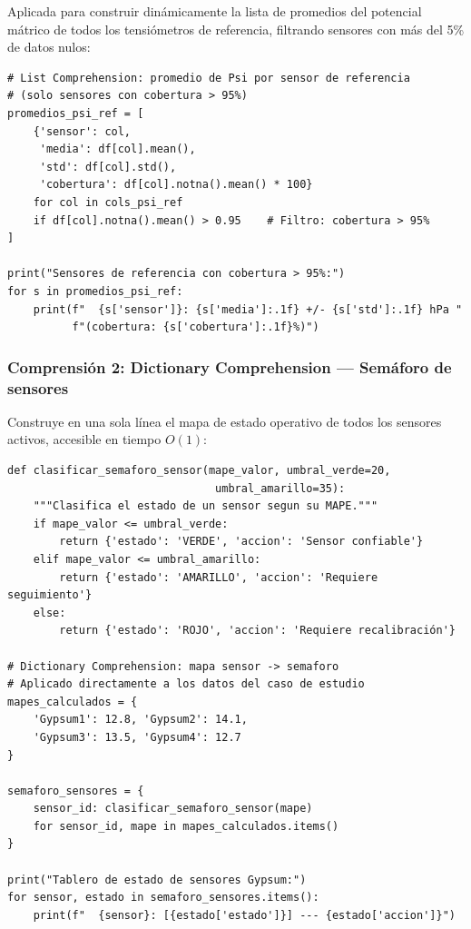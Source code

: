 \documentclass[12pt,a4paper]{article}
\begin{document}
Aplicada para construir dinámicamente la lista de promedios del potencial mátrico de todos los tensiómetros de referencia, filtrando sensores con más del 5\% de datos nulos:

\begin{lstlisting}[caption={List Comprehension para estadísticas filtradas de sensores.}, label=lst:lc]
# List Comprehension: promedio de Psi por sensor de referencia
# (solo sensores con cobertura > 95%)
promedios_psi_ref = [
    {'sensor': col, 
     'media': df[col].mean(), 
     'std': df[col].std(),
     'cobertura': df[col].notna().mean() * 100}
    for col in cols_psi_ref 
    if df[col].notna().mean() > 0.95    # Filtro: cobertura > 95%
]

print("Sensores de referencia con cobertura > 95%:")
for s in promedios_psi_ref:
    print(f"  {s['sensor']}: {s['media']:.1f} +/- {s['std']:.1f} hPa "
          f"(cobertura: {s['cobertura']:.1f}%)")
\end{lstlisting}

\subsubsection{Comprensión 2: Dictionary Comprehension --- Semáforo de sensores}

Construye en una sola línea el mapa de estado operativo de todos los sensores activos, accesible en tiempo $O(1)$:

\begin{lstlisting}[caption={Dictionary Comprehension para clasificación tipo semáforo.}, label=lst:dc]
def clasificar_semaforo_sensor(mape_valor, umbral_verde=20, 
                                umbral_amarillo=35):
    """Clasifica el estado de un sensor segun su MAPE."""
    if mape_valor <= umbral_verde:
        return {'estado': 'VERDE', 'accion': 'Sensor confiable'}
    elif mape_valor <= umbral_amarillo:
        return {'estado': 'AMARILLO', 'accion': 'Requiere seguimiento'}
    else:
        return {'estado': 'ROJO', 'accion': 'Requiere recalibración'}

# Dictionary Comprehension: mapa sensor -> semaforo
# Aplicado directamente a los datos del caso de estudio
mapes_calculados = {
    'Gypsum1': 12.8, 'Gypsum2': 14.1, 
    'Gypsum3': 13.5, 'Gypsum4': 12.7
}

semaforo_sensores = {
    sensor_id: clasificar_semaforo_sensor(mape)
    for sensor_id, mape in mapes_calculados.items()
}

print("Tablero de estado de sensores Gypsum:")
for sensor, estado in semaforo_sensores.items():
    print(f"  {sensor}: [{estado['estado']}] --- {estado['accion']}")
\end{lstlisting}
\end{document}
